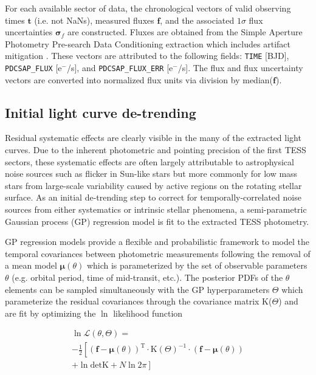 For each available sector of data, the chronological vectors of valid observing times $\mathbf{t}$
(i.e. not NaNs), measured fluxes $\mathbf{f}$, and the associated $1\sigma$ flux
uncertainties $\boldsymbol{\sigma}_{f}$ are constructed. Fluxes are obtained from the Simple Aperture Photometry Pre-search
Data Conditioning extraction which includes artifact mitigation \citep{smith12}. These vectors are
attributed to the following fields: \texttt{TIME} [BJD], \texttt{PDCSAP\_FLUX} [e$^-$/s], and
\texttt{PDCSAP\_FLUX\_ERR} [e$^-$/s]. The flux and flux uncertainty vectors are converted into normalized
flux units via division by median($\mathbf{f}$).

\subsection{Initial light curve de-trending} \label{sect:detrend}
Residual systematic effects are clearly visible in the many of the extracted light curves. Due to the
inherent photometric and pointing precision of the first TESS sectors, these systematic effects
are often largely attributable to astrophysical noise sources such as flicker \citep{bastien13} in
Sun-like stars but more commonly for low mass stars from
large-scale variability caused by active regions on the rotating stellar surface. As an initial de-trending step
to correct for temporally-correlated noise sources from either systematics or intrinsic stellar phenomena,
a semi-parametric Gaussian process (GP) regression model is fit to the extracted TESS photometry.

GP regression models provide a flexible and probabilistic framework to model the temporal
covariances between photometric measurements following the removal of a mean model
$\boldsymbol{\mu}(\theta)$ which is parameterized by the set of observable parameters $\theta$
(e.g. orbital period, time of mid-transit, etc.). The posterior PDFs of the $\theta$ elements 
can be sampled simultaneously with the GP hyperparameters $\Theta$ which parameterize
the residual covariances through the covariance matrix K($\Theta$) and are fit by
optimizing the $\ln$ likelihood function

\begin{multline}
  \ln{\mathcal{L}(\theta,\Theta)} = \\
  -\frac{1}{2} \left[ (\mathbf{f}-\boldsymbol{\mu}(\theta))^{\text{T}}
    \cdot \text{K}(\Theta)^{-1} \cdot (\mathbf{f}-\boldsymbol{\mu}(\theta)) \right. \\
    \left. + \ln{\mathrm{det} \text{K}} + N \ln{2 \pi} \right] \label{eq:lnL}
\end{multline}

